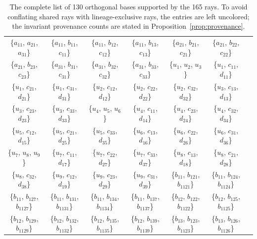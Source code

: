 \documentclass[%
  reprint,
  superscriptaddress,
  showpacs,
  showkeys,
  amsmath,amssymb,
  pra,
  longbibliography,
  floatfix,
  x11names
]{revtex4-2}
\newcommand{\rev}[1]{{\color{revisionblue}#1}}
\begin{document}
\begin{table}[htbp!]
\caption{
\rev{The complete list of 130 orthogonal bases supported by the 165 rays.  To avoid conflating shared rays with lineage-exclusive rays, the entries are left uncolored; the invariant provenance counts are stated in Proposition~\ref{prop:provenance}.}
}
\label{tab:orthogonal_bases}
\begin{ruledtabular}
\begin{tabular}{ccccccc} %

{\{$a_{11}$, $a_{21}$, $a_{31}$\}} & {\{$a_{11}$, $b_{11}$, $c_{11}$\}} & {\{$a_{11}$, $b_{12}$, $c_{12}$\}} & {\{$a_{11}$, $b_{13}$, $c_{13}$\}} & {\{$a_{21}$, $b_{21}$, $c_{21}$\}} & {\{$a_{21}$, $b_{22}$, $c_{22}$\}} \\
{\{$a_{21}$, $b_{23}$, $c_{23}$\}} & {\{$a_{31}$, $b_{31}$, $c_{31}$\}} & {\{$a_{31}$, $b_{32}$, $c_{32}$\}} & {\{$a_{31}$, $b_{33}$, $c_{33}$\}} & \{$u_{1}$, $u_{2}$, $u_{3}$\} & \{$u_{1}$, $c_{11}$, $d_{11}$\} \\
\{$u_{1}$, $c_{21}$, $d_{21}$\} & \{$u_{1}$, $c_{31}$, $d_{31}$\} & \{$u_{2}$, $c_{12}$, $d_{12}$\} & \{$u_{2}$, $c_{22}$, $d_{22}$\} & \{$u_{2}$, $c_{32}$, $d_{32}$\} & \{$u_{3}$, $c_{13}$, $d_{13}$\} \\
\{$u_{3}$, $c_{23}$, $d_{23}$\} & \{$u_{3}$, $c_{33}$, $d_{33}$\} & \{$u_{4}$, $u_{5}$, $u_{6}$\} & \{$u_{4}$, $c_{11}$, $d_{14}$\} & \{$u_{4}$, $c_{23}$, $d_{24}$\} & \{$u_{4}$, $c_{32}$, $d_{34}$\} \\
\{$u_{5}$, $c_{12}$, $d_{15}$\} & \{$u_{5}$, $c_{21}$, $d_{25}$\} & \{$u_{5}$, $c_{33}$, $d_{35}$\} & \{$u_{6}$, $c_{13}$, $d_{16}$\} & \{$u_{6}$, $c_{22}$, $d_{26}$\} & \{$u_{6}$, $c_{31}$, $d_{36}$\} \\
\{$u_{7}$, $u_{8}$, $u_{9}$\} & \{$u_{7}$, $c_{11}$, $d_{17}$\} & \{$u_{7}$, $c_{22}$, $d_{27}$\} & \{$u_{7}$, $c_{33}$, $d_{37}$\} & \{$u_{8}$, $c_{13}$, $d_{18}$\} & \{$u_{8}$, $c_{21}$, $d_{28}$\} \\
\{$u_{8}$, $c_{32}$, $d_{38}$\} & \{$u_{9}$, $c_{12}$, $d_{19}$\} & \{$u_{9}$, $c_{23}$, $d_{29}$\} & \{$u_{9}$, $c_{31}$, $d_{39}$\} & \{$b_{11}$, $b_{121}$, $b_{1121}$\} & \{$b_{11}$, $b_{124}$, $b_{1124}$\} \\
\{$b_{11}$, $b_{127}$, $b_{1127}$\} & \{$b_{11}$, $b_{131}$, $b_{1131}$\} & \{$b_{11}$, $b_{134}$, $b_{1134}$\} & \{$b_{11}$, $b_{137}$, $b_{1137}$\} & \{$b_{12}$, $b_{122}$, $b_{1122}$\} & \{$b_{12}$, $b_{125}$, $b_{1125}$\} \\
\{$b_{12}$, $b_{129}$, $b_{1129}$\} & \{$b_{12}$, $b_{132}$, $b_{1132}$\} & \{$b_{12}$, $b_{135}$, $b_{1135}$\} & \{$b_{12}$, $b_{139}$, $b_{1139}$\} & \{$b_{13}$, $b_{123}$, $b_{1123}$\} & \{$b_{13}$, $b_{126}$, $b_{1126}$\} \\

\end{tabular}
\end{ruledtabular}
\end{table}
\end{document}
